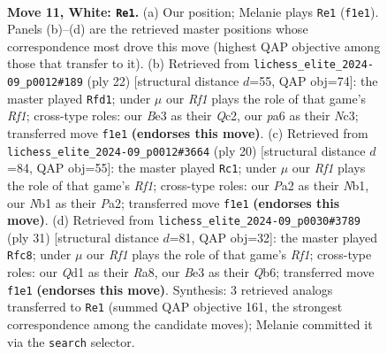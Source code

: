 \documentclass[11pt]{article}
\begin{document}
\clearpage

\begin{figure}[p]\centering
\begin{subfigure}{0.46\textwidth}\centering
\resizebox{\linewidth}{!}{%
\newchessgame
\chessboard[
  setfen={rnb2rk1/1pp1bppp/pn1qp3/4N3/2pP4/4B1P1/PP2PPBP/RN1Q1RK1 w - - 0 11},
  showmover=false,
  pgfstyle=straightmove, color=movearrow, markmove={f1-e1}
]}
\caption{}
\end{subfigure}\hfill
\begin{subfigure}{0.46\textwidth}\centering
\resizebox{\linewidth}{!}{%
\newchessgame
\chessboard[
  setfen={rnb2rk1/p3bppp/1pp1pn2/2q1N3/2p2B2/2N3P1/PPQ1PPBP/R4RK1 w - - 2 12},
  showmover=false,
  pgfstyle=straightmove, color=movearrow, markmove={f1-d1}
]}
\caption{}
\end{subfigure}
\\[4pt]
\begin{subfigure}{0.46\textwidth}\centering
\resizebox{\linewidth}{!}{%
\newchessgame
\chessboard[
  setfen={rnq2rk1/pp3ppp/2pb1n2/3pNb2/3P1B2/1Q4P1/PP2PPBP/RN3RK1 w - - 3 11},
  showmover=false,
  pgfstyle=straightmove, color=movearrow, markmove={f1-c1}
]}
\caption{}
\end{subfigure}\hfill
\begin{subfigure}{0.46\textwidth}\centering
\resizebox{\linewidth}{!}{%
\newchessgame
\chessboard[
  setfen={r4rk1/1p2ppbp/1qbp2p1/p1n5/2P1P3/1PN1BP2/P2QB1PP/1RR3K1 b - - 6 16},
  showmover=false,
  pgfstyle=straightmove, color=movearrow, markmove={f8-c8}
]}
\caption{}
\end{subfigure}
\caption{\textbf{Move 11, White: \texttt{Re1}.} (a) Our position; Melanie plays \texttt{Re1} (\texttt{f1e1}). Panels (b)--(d) are the retrieved master positions whose correspondence most drove this move (highest QAP objective among those that transfer to it). (b) Retrieved from \texttt{lichess\_elite\_2024-09\_p0012\#189} (ply 22) [structural distance $d$=55, QAP obj=74]: the master played \texttt{Rfd1}; under $\mu$ our \emph{Rf1} plays the role of that game's \emph{Rf1}; cross-type roles: our \emph{B}e3 as their \emph{Q}c2, our \emph{p}a6 as their \emph{N}c3; transferred move \texttt{f1e1} \textbf{(endorses this move)}. (c) Retrieved from \texttt{lichess\_elite\_2024-09\_p0012\#3664} (ply 20) [structural distance $d$=84, QAP obj=55]: the master played \texttt{Rc1}; under $\mu$ our \emph{Rf1} plays the role of that game's \emph{Rf1}; cross-type roles: our \emph{P}a2 as their \emph{N}b1, our \emph{N}b1 as their \emph{P}a2; transferred move \texttt{f1e1} \textbf{(endorses this move)}. (d) Retrieved from \texttt{lichess\_elite\_2024-09\_p0030\#3789} (ply 31) [structural distance $d$=81, QAP obj=32]: the master played \texttt{Rfc8}; under $\mu$ our \emph{Rf1} plays the role of that game's \emph{Rf1}; cross-type roles: our \emph{Q}d1 as their \emph{R}a8, our \emph{B}e3 as their \emph{Q}b6; transferred move \texttt{f1e1} \textbf{(endorses this move)}. Synthesis: 3 retrieved analogs transferred to \texttt{Re1} (summed QAP objective 161, the strongest correspondence among the candidate moves); Melanie committed it via the \texttt{search} selector.}
\label{fig:thought-m20}
\end{figure}
\end{document}
